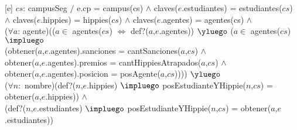 \begin{Representacion}
  ~


  ~


  ~
  

  ~
  
  
  ~
  
  [e]
  {$cs$: campusSeg $/$ e.cp = campus(cs) $\land$ claves($e$.estudiantes) = estudiantes($cs$) \\ $\land$ claves($e$.hippies) = hippies($cs$) $\land$ claves($e$.agentes) = agentes(cs) $\land$ \\
  ($\forall a$: agente)(($a \in$ agentes($cs$) $\iff$ def?($a$,$e$.agentes)) $\yluego$ ($a \in$ agentes($cs$) $\impluego$ \\
  (obtener($a$,$e$.agentes).sanciones = cantSanciones($a$,$cs$) $\land$\\
  obtener($a$,$e$.agentes).premios = cantHippiesAtrapados($a$,$cs$) $\land$\\
  obtener($a$,$e$.agentes).posicion = posAgente($a$,$cs$)))) $\yluego$ \\
  ($\forall n:$ nombre)(def?($n$,$e$.hippies) $\impluego$ posEstudianteYHippie($n$,$cs$) = obtener($a$,$e$.hippies)) $\land$\\
  (def?($n$,$e$.estudiantes) $\impluego$ posEstudianteYHippie($n$,$cs$) = obtener($a$,$e$.estudiantes)) }


\end{Representacion}


